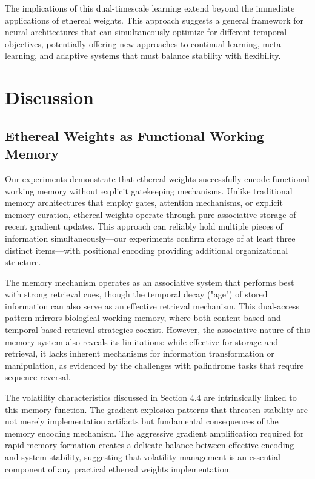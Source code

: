 \documentclass{article} %
\begin{document}
The implications of this dual-timescale learning extend beyond the immediate applications of ethereal weights. This approach suggests a general framework for neural architectures that can simultaneously optimize for different temporal objectives, potentially offering new approaches to continual learning, meta-learning, and adaptive systems that must balance stability with flexibility.

\section{Discussion}

\subsection{Ethereal Weights as Functional Working Memory}

Our experiments demonstrate that ethereal weights successfully encode functional working memory without explicit gatekeeping mechanisms. Unlike traditional memory architectures that employ gates, attention mechanisms, or explicit memory curation, ethereal weights operate through pure associative storage of recent gradient updates. This approach can reliably hold multiple pieces of information simultaneously—our experiments confirm storage of at least three distinct items—with positional encoding providing additional organizational structure.

The memory mechanism operates as an associative system that performs best with strong retrieval cues, though the temporal decay ("age") of stored information can also serve as an effective retrieval mechanism. This dual-access pattern mirrors biological working memory, where both content-based and temporal-based retrieval strategies coexist. However, the associative nature of this memory system also reveals its limitations: while effective for storage and retrieval, it lacks inherent mechanisms for information transformation or manipulation, as evidenced by the challenges with palindrome tasks that require sequence reversal.

The volatility characteristics discussed in Section 4.4 are intrinsically linked to this memory function. The gradient explosion patterns that threaten stability are not merely implementation artifacts but fundamental consequences of the memory encoding mechanism. The aggressive gradient amplification required for rapid memory formation creates a delicate balance between effective encoding and system stability, suggesting that volatility management is an essential component of any practical ethereal weights implementation.
\end{document}
